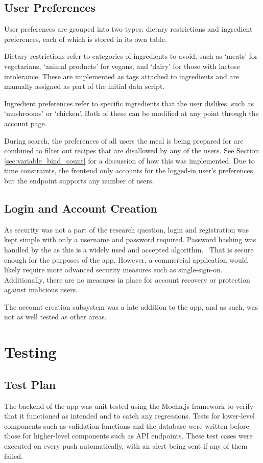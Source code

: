\subsection{User Preferences}
User preferences are grouped into two types: dietary restrictions and ingredient preferences, each of which is stored
in its own table.

Dietary restrictions refer to categories of ingredients to avoid, such as \enquote*{meats} for vegetarians,
\enquote*{animal products} for vegans, and \enquote*{dairy} for those with lactose intolerance. These are implemented
as tags attached to ingredients and are manually assigned as part of the initial data script.

Ingredient preferences refer to specific ingredients that the user dislikes, such as \enquote*{mushrooms} or
\enquote*{chicken}. Both of these can be modified at any point through the account page.

During search, the preferences of all users the meal is being prepared for are combined to filter out recipes
that are disallowed by any of the users. See Section \ref{sec:variable_bind_count} for a discussion of how this was implemented.
Due to time constraints, the frontend only accounts for the logged-in user's preferences, but the endpoint
supports any number of users.

\subsection{Login and Account Creation}
As security was not a part of the research question, login and registration was kept simple with only a username
and password required. Password hashing was handled by the  as this is a widely used and
accepted algorithm.~\cite{ntantogian_evaluation_2019} That is secure enough for the purposes of the app. However,
a commercial application would likely require more advanced security measures such as single-sign-on. Additionally,
there are no measures in place for account recovery or protection against malicious users.

The account creation subsystem was a late addition to the app, and as such, was not as well tested as other areas.

\section{Testing}

\subsection{Test Plan}
The backend of the app was unit tested using the Mocha.js framework
to verify that it functioned as intended and to catch any regressions. Tests for lower-level components
such as validation functions and the database were written before those for higher-level
components such as API endpoints. These test cases were executed on every push automatically,
with an alert being sent if any of them failed.

